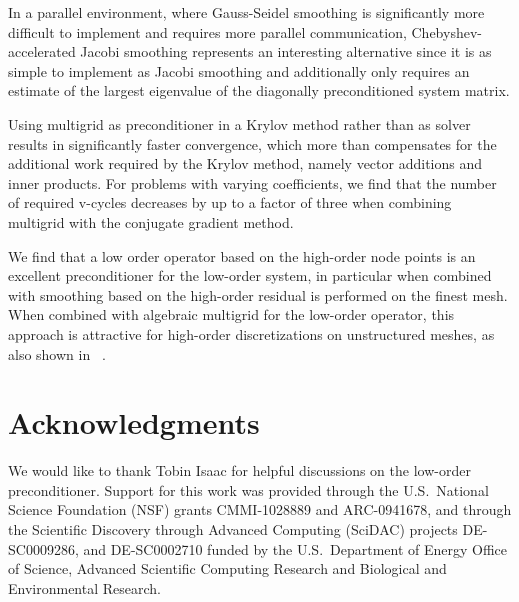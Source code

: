 \documentclass[smallcondensed,final]{svjour3}     %
\begin{document}
In a parallel environment, where Gauss-Seidel smoothing is
significantly more difficult to implement and requires more parallel
communication, Chebyshev-accelerated Jacobi smoothing represents an
interesting alternative since it is as simple to implement as Jacobi
smoothing and additionally only requires an estimate of the largest
eigenvalue of the diagonally preconditioned system matrix.

Using multigrid as preconditioner in a Krylov method rather than as
solver results in significantly faster convergence, which more than
compensates for the additional work required by the Krylov method,
namely vector additions and inner products.  For problems with varying
coefficients, we find that the number of required v-cycles decreases
by up to a factor of three when combining multigrid with the conjugate
gradient method.

We find that a low order operator based on the high-order node points
is an excellent preconditioner for the low-order system, in particular
when combined with smoothing based on the high-order residual is
performed on the finest mesh.  When combined with algebraic multigrid
for the low-order operator, this approach is attractive for high-order
discretizations on unstructured meshes, as also shown in
~\cite{Brown10, DevilleMund90, HeysManteuffelMcCormickEtAl05}.



\section*{Acknowledgments}
We would like to thank Tobin Isaac for helpful discussions on the
low-order preconditioner. Support for this work was
  provided through the U.S.~National Science Foundation (NSF) grants
  CMMI-1028889 and   %
  ARC-0941678,       %
 and through the Scientific Discovery through Advanced
  Computing (SciDAC) projects 
  DE-SC0009286,   %
  and DE-SC0002710 %
  funded by the U.S.~Department of Energy
  Office of Science, Advanced Scientific Computing Research and
  Biological and Environmental Research.




\end{document}
